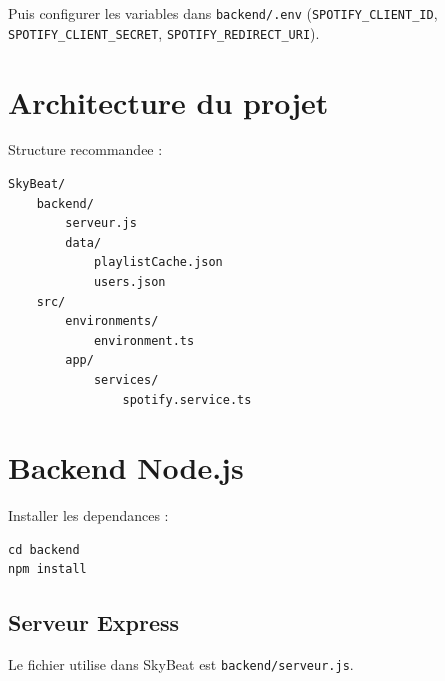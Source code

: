 \documentclass[a4paper,11pt]{article}
\begin{document}
Puis configurer les variables dans \texttt{backend/.env} (\texttt{SPOTIFY\_CLIENT\_ID}, \texttt{SPOTIFY\_CLIENT\_SECRET}, \texttt{SPOTIFY\_REDIRECT\_URI}).

\section{Architecture du projet}

Structure recommandee :

\begin{lstlisting}
SkyBeat/
    backend/
        serveur.js
        data/
            playlistCache.json
            users.json
    src/
        environments/
            environment.ts
        app/
            services/
                spotify.service.ts
\end{lstlisting}

\section{Backend Node.js}

Installer les dependances :

\begin{lstlisting}
cd backend
npm install
\end{lstlisting}

\subsection{Serveur Express}

Le fichier utilise dans SkyBeat est \texttt{backend/serveur.js}.
\end{document}
